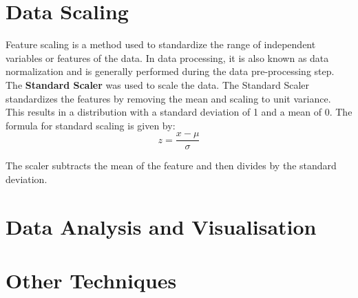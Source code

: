 \section{Data Scaling}
Feature scaling is a method used to standardize the range of independent variables or features of the data. In data processing, it is also known as data 
normalization and is generally performed during the data pre-processing step.
The \textbf{Standard Scaler} was used to scale the data. The Standard Scaler standardizes the features by removing the mean and scaling to unit variance.
This results in a distribution with a standard deviation of 1 and a mean of 0. The formula for standard scaling is given by:
\begin{equation}
    z = \frac{x - \mu}{\sigma}
\end{equation}

The scaler subtracts the mean of the feature and then divides by the standard deviation.

\section{Data Analysis and Visualisation}

\section{Other Techniques}



